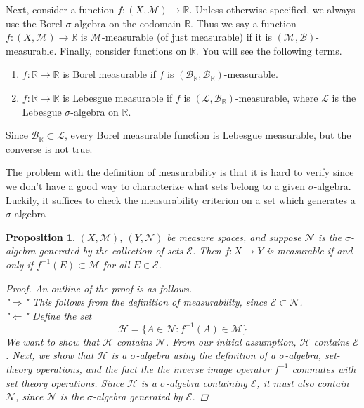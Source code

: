\documentclass[12pt]{amsart}         %
\newtheorem{proposition}{Proposition}[section]
\theoremstyle{remark}
\newcommand{\R}{\mathbb{R}}
\begin{document}
Next, consider a function $f: (X,\mathcal{M}) \rightarrow \R$. Unless otherwise specified, we always use the Borel $\sigma$-algebra on the codomain $\R$. Thus we say a function $f: (X,\mathcal{M}) \rightarrow \R$ is $\mathcal{M}$-measurable (of just measurable) if it is $(\mathcal{M},\mathcal{B})$-measurable. Finally, consider functions on $\R$. You will see the following terms.
\begin{enumerate}
    \item $f: \R \rightarrow \R$ is Borel measurable if $f$ is $(\mathcal{B}_\R,\mathcal{B}_\R)$-measurable.
    \item $f: \R \rightarrow \R$ is Lebesgue measurable if $f$ is $(\mathcal{L},\mathcal{B}_\R)$-measurable, where $\mathcal{L}$ is the Lebesgue $\sigma$-algebra on $\R$.
\end{enumerate}
Since $\mathcal{B}_\R \subset \mathcal{L}$, every Borel measurable function is Lebesgue measurable, but the converse is not true.

The problem with the definition of measurability is that it is hard to verify since we don't have a good way to characterize what sets belong to a given $\sigma$-algebra. Luckily, it suffices to check the measurability criterion on a set which generates a $\sigma$-algebra

\begin{proposition}
$(X,\mathcal{M})$, $(Y,\mathcal{N})$ be measure spaces, and suppose $\mathcal{N}$ is the $\sigma$-algebra generated by the collection of sets $\mathcal{E}$. Then $f: X \to Y$ is measurable if and only if $f^{-1}(E) \subset \mathcal{M}$ for all $E \in \mathcal{E}$.

\begin{proof}An outline of the proof is as follows.\\
"$\Rightarrow$" This follows from the definition of measurability, since $\mathcal{E} \subset \mathcal{N}$.\\
"$\Leftarrow$" Define the set
\[
\mathcal{H}=\{A \in \mathcal{N}: f^{-1}(A) \in \mathcal{M}\}
\]
We want to show that $\mathcal{H}$ contains $\mathcal{N}$. From our initial assumption, $\mathcal{H}$ contains $\mathcal{E}$. Next, we show that $\mathcal{H}$ is a $\sigma$-algebra using the definition of a $\sigma$-algebra, set-theory operations, and the fact the the inverse image operator $f^{-1}$ commutes with set theory operations. Since $\mathcal{H}$ is a $\sigma$-algebra containing $\mathcal{E}$, it must also contain $\mathcal{N}$, since $\mathcal{N}$ is the $\sigma$-algebra generated by $\mathcal{E}$.
\end{proof}
\end{proposition}
\end{document}
